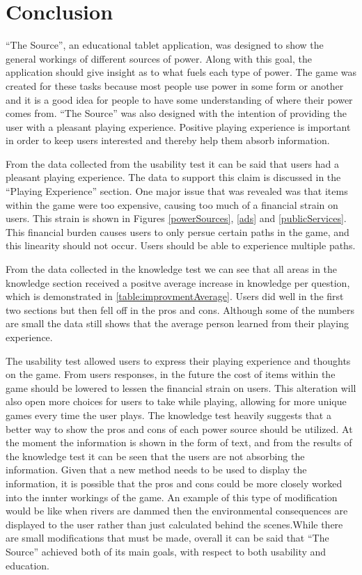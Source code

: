 \documentclass[msc,oneside]{ubcthesis}%
\begin{document}
\chapter{Conclusion}
    ``The Source'', an educational tablet application, was designed to show the general workings of different sources of power. Along with this goal, the application should give insight as to what fuels each type of power. The game was created for these tasks because most people use power in some form or another and it is a good idea for people to have some understanding of where their power comes from. ``The Source'' was also designed with the intention of providing the user with a pleasant playing experience. Positive playing experience is important in order to keep users interested and thereby help them absorb information.

    \medskip

    From the data collected from the usability test it can be said that users had a pleasant playing experience. The data to support this claim is discussed in the ``Playing Experience'' section. One major issue that was revealed was that items within the game were too expensive, causing too much of a financial strain on users. This strain is shown in Figures \ref{powerSources}, \ref{ads} and \ref{publicServices}. This financial burden causes users to only persue certain paths in the game, and this linearity should not occur. Users should be able to experience multiple paths.

    From the data collected in the knowledge test we can see that all areas in the knowledge section received a positve average increase in knowledge per question, which is demonstrated in \ref{table:improvmentAverage}. Users did well in the first two sections but then fell off in the pros and cons. Although some of the numbers are small the data still shows that the average person learned from their playing experience. 

    \medskip

    The usability test allowed users to express their playing experience and thoughts on the game. From users responses, in the future the cost of items within the game should be lowered to lessen the financial strain on users. This alteration will also open more choices for users to take while playing, allowing for more unique games every time the user plays. The knowledge test heavily suggests that a better way to show the pros and cons of each power source should be utilized. At the moment the information is shown in the form of text, and from the results of the knowledge test it can be seen that the users are not absorbing the information. Given that a new method needs to be used to display the information, it is possible that the pros and cons could be more closely worked into the innter workings of the game. An example of this type of modification would be like when rivers are dammed then the environmental consequences are displayed to the user rather than just calculated behind the scenes.While there are small modifications that must be made, overall it can be said that ``The Source'' achieved both of its main goals, with respect to both usability and education. 
\end{document}

